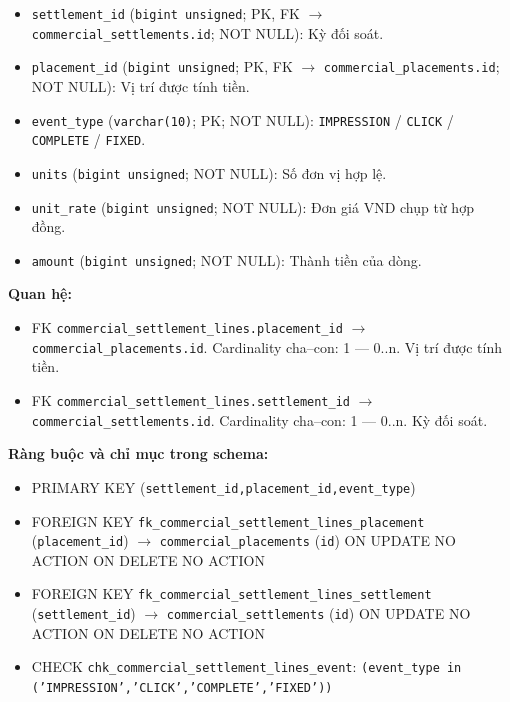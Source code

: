 \begin{itemize}

\item \texttt{settlement\_id} (\texttt{bigint unsigned}; PK, FK $\rightarrow$ \texttt{commercial\_settlements.id}; NOT NULL): Kỳ đối soát.

\item \texttt{placement\_id} (\texttt{bigint unsigned}; PK, FK $\rightarrow$ \texttt{commercial\_placements.id}; NOT NULL): Vị trí được tính tiền.

\item \texttt{event\_type} (\texttt{varchar(10)}; PK; NOT NULL): \texttt{IMPRESSION} / \texttt{CLICK} / \texttt{COMPLETE} / \texttt{FIXED}.

\item \texttt{units} (\texttt{bigint unsigned}; NOT NULL): Số đơn vị hợp lệ.

\item \texttt{unit\_rate} (\texttt{bigint unsigned}; NOT NULL): Đơn giá VND chụp từ hợp đồng.

\item \texttt{amount} (\texttt{bigint unsigned}; NOT NULL): Thành tiền của dòng.

\end{itemize}

\textbf{Quan hệ:}

\begin{itemize}

\item FK \texttt{commercial\_settlement\_lines.placement\_id} $\rightarrow$ \texttt{commercial\_placements.id}. Cardinality cha--con: 1 — 0..n. Vị trí được tính tiền.

\item FK \texttt{commercial\_settlement\_lines.settlement\_id} $\rightarrow$ \texttt{commercial\_settlements.id}. Cardinality cha--con: 1 — 0..n. Kỳ đối soát.

\end{itemize}

\textbf{Ràng buộc và chỉ mục trong schema:}

\begin{itemize}

\item PRIMARY KEY (\texttt{settlement\_id,placement\_id,event\_type})

\item FOREIGN KEY \texttt{fk\_commercial\_settlement\_lines\_placement} (\texttt{placement\_id}) $\rightarrow$ \texttt{commercial\_placements} (\texttt{id}) ON UPDATE NO ACTION ON DELETE NO ACTION

\item FOREIGN KEY \texttt{fk\_commercial\_settlement\_lines\_settlement} (\texttt{settlement\_id}) $\rightarrow$ \texttt{commercial\_settlements} (\texttt{id}) ON UPDATE NO ACTION ON DELETE NO ACTION

\item CHECK \texttt{chk\_commercial\_settlement\_lines\_event}: \texttt{(event\_type in ('IMPRESSION','CLICK','COMPLETE','FIXED'))}

\end{itemize}

